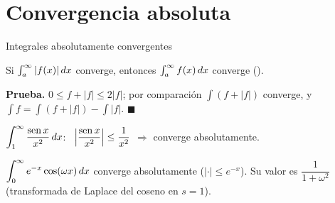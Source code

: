 \documentclass[10pt,aspectratio=169]{beamer}
\begin{document}
\section{Convergencia absoluta}

\begin{frame}{Integrales absolutamente convergentes}
  \begin{teorema}
    Si $\int_a^\infty|f(x)|\,dx$ converge, entonces $\int_a^\infty f(x)\,dx$ converge ().
  \end{teorema}
  \textbf{Prueba.} $0\le f+|f|\le2|f|$; por comparación $\int(f+|f|)$ converge, y $\int f=\int(f+|f|)-\int|f|$. $\blacksquare$
  \begin{ejemplo}[12]
    $\displaystyle\int_1^\infty\frac{\operatorname{sen} x}{x^2}\,dx$: \ $\left|\dfrac{\operatorname{sen} x}{x^2}\right|\le\dfrac1{x^2}$ $\Rightarrow$ converge absolutamente.
  \end{ejemplo}
  \begin{ejemplo}[13]
    $\displaystyle\int_0^\infty e^{-x}\cos(\omega x)\,dx$ converge absolutamente ($|\cdot|\le e^{-x}$). Su valor es $\dfrac{1}{1+\omega^2}$
    (transformada de Laplace del coseno en $s=1$).
  \end{ejemplo}
\end{frame}
\end{document}
